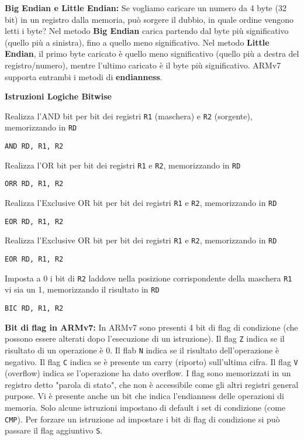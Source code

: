 \begin{defn}
\textbf{Big Endian e Little Endian:} Se vogliamo caricare un numero da 4 byte (32 bit) in un registro dalla memoria, può sorgere il dubbio, in quale ordine vengono letti i byte? Nel metodo \textbf{Big Endian} carica partendo dal byte più significativo (quello più a sinistra), fino a quello meno significativo. Nel metodo \textbf{Little Endian}, il primo byte caricato è quello meno significativo (quello più a destra del registro/numero), mentre l'ultimo caricato è il byte più significativo. ARMv7 supporta entrambi i metodi di \textbf{endianness}.
\end{defn}

\begin{defn}
\textbf{Istruzioni Logiche Bitwise}

Realizza l'AND bit per bit dei registri \verb|R1| (maschera) e \verb|R2| (sorgente), memorizzando in \verb|RD|
\begin{lstlisting}[style=arm]
AND RD, R1, R2
\end{lstlisting}

Realizza l'OR bit per bit dei registri \verb|R1| e \verb|R2|, memorizzando in \verb|RD|
\begin{lstlisting}[style=arm]
ORR RD, R1, R2
\end{lstlisting}

Realizza l'Exclusive OR bit per bit dei registri \verb|R1| e \verb|R2|, memorizzando in \verb|RD|
\begin{lstlisting}[style=arm]
EOR RD, R1, R2
\end{lstlisting}

Realizza l'Exclusive OR bit per bit dei registri \verb|R1| e \verb|R2|, memorizzando in \verb|RD|
\begin{lstlisting}[style=arm]
EOR RD, R1, R2
\end{lstlisting}

Imposta a 0 i bit di \verb|R2| laddove nella posizione corrispondente della maschera \verb|R1| vi sia un 1, memorizzando il risultato in \verb|RD|
\begin{lstlisting}[style=arm]
BIC RD, R1, R2
\end{lstlisting}
\end{defn}

\begin{defn}
\textbf{Bit di flag in ARMv7:}
In ARMv7 sono presenti 4 bit di flag di condizione (che possono essere alterati dopo l'esecuzione di un istruzione). Il flag \verb|Z| indica se il risultato di un operazione è 0. Il flab \verb|N| indica se il risultato dell'operazione è negativo. Il flag \verb|C| indica se è presente un carry (riporto) sull'ultima cifra. Il flag \verb|V| (overflow) indica se l'operazione ha dato overflow. I flag sono memorizzati in un registro detto "parola di stato", che non è accessibile come gli altri registri general purpose. Vi è presente anche un bit che indica l'endianness delle operazioni di memoria.
Solo alcune istruzioni impostano di default i set di condizione (come \verb|CMP|). Per forzare un istruzione ad impostare i bit di flag di condizione si può passare il flag aggiuntivo \verb|S|.
\end{defn}

